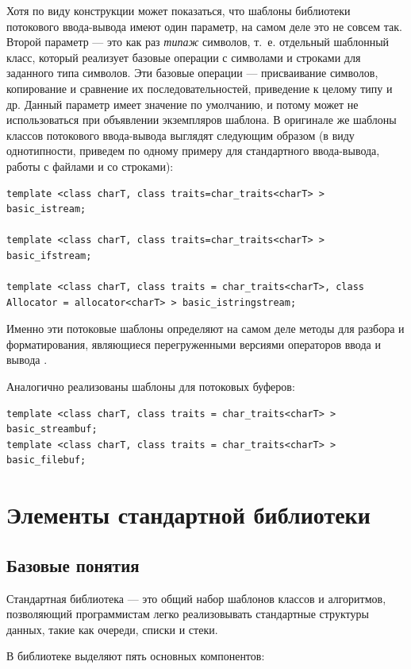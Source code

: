 Хотя по виду конструкции  может показаться, что шаблоны библиотеки потокового ввода-вывода
имеют один параметр, на самом деле это не совсем так.  Второй  параметр --- это как раз \emph{типаж }символов, т.~е.
отдельный шаблонный класс, который реализует базовые операции с символами и строками для заданного типа символов. Эти
базовые операции --- присваивание символов, копирование и сравнение их последовательностей, приведение к целому типу
и др. Данный параметр имеет значение по умолчанию, и потому может не использоваться при объявлении экземпляров шаблона.
В оригинале же шаблоны классов потокового ввода-вывода выглядят следующим образом (в виду однотипности, приведем по
одному примеру для стандартного ввода-вывода, работы с файлами и со строками):
\begin{lstlisting}
template <class charT, class traits=char_traits<charT> > basic_istream;

template <class charT, class traits=char_traits<charT> > basic_ifstream;

template <class charT, class traits = char_traits<charT>, class Allocator = allocator<charT> > basic_istringstream;
\end{lstlisting}

Именно эти потоковые шаблоны определяют на самом деле методы для разбора и форматирования, являющиеся перегруженными
версиями операторов ввода   и вывода
.

Аналогично реализованы шаблоны для потоковых буферов:
\begin{lstlisting}
template <class charT, class traits = char_traits<charT> > basic_streambuf;
template <class charT, class traits = char_traits<charT> > basic_filebuf;
\end{lstlisting}

\section[Элементы стандартной библиотеки \Sys{C++}]{Элементы стандартной библиотеки }
\subsection[Базовые понятия]{Базовые понятия}
Стандартная библиотека  --- это общий набор шаблонов классов и алгоритмов, позволяющий программистам легко
реализовывать стандартные структуры данных, такие как очереди, списки и стеки.

В библиотеке выделяют пять основных компонентов:

